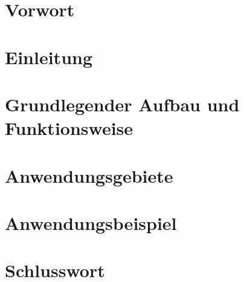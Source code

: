 \documentclass{article}
\begin{document}
    

    \tableofcontents
    \thispagestyle{empty}
    \newpage


    \section{Vorwort}
    
    \newpage

    \section{Einleitung}
    
    \newpage

    \section{Grundlegender Aufbau und Funktionsweise}
    
    \newpage

    \section{Anwendungsgebiete}
    
    \newpage

    \section{Anwendungsbeispiel}
    
    \newpage

    \section{Schlusswort}
    
    \newpage

    
\end{document}
